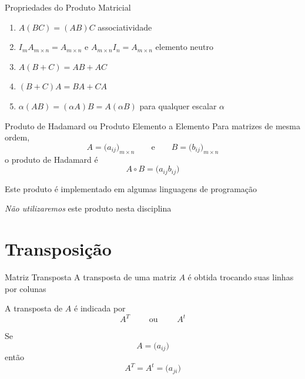\documentclass[fleqn,aspectratio=169,12pt]{beamer}
\begin{document}
\begin{frame}{Propriedades do Produto Matricial}

\begin{enumerate}[<+->][(i)\;]
\itemsep=1em
\item $A(BC) = (AB)C$
      \tabto{85mm} associatividade
\item \(I_m A_{m \times n} = A_{m \times n}\)
      \quad e \quad
      \(A_{m \times n} I_n = A_{m \times n}\)
      \tabto{85mm} elemento neutro
\item $A(B + C) = AB + AC$
\item $(B + C)A = BA + CA$
\item $\alpha(AB) = (\alpha A)B = A(\alpha B)$
      \tabto{85mm} para qualquer escalar $\alpha$
\end{enumerate}

\bigskip
{}
\end{frame}

\begin{frame}{Produto de Hadamard ou Produto Elemento a Elemento}
Para matrizes de mesma ordem,
\[
  A = \big( a_{ij} \big)_{m\times n}
  \qquad\text{e}\qquad
  B = \big( b_{ij} \big)_{m\times n}
\]
\pause
o produto de Hadamard é
\[
  A\circ B = \big( a_{ij} b_{ij} \big)
\]

\pause
Este produto é implementado em algumas linguagens de programação

\pause
\emph{Não utilizaremos} este produto nesta disciplina
\end{frame}

\section{Transposição}

\begin{frame}{Matriz Transposta}
  A transposta de uma matriz $A$ é obtida trocando suas
  linhas por colunas

  \pause
  A transposta de $A$ é indicada por
  \[
    A^T
    \qquad\text{ ou }\qquad
    A^t
  \]

  \pause
  Se
  \[
    A = \big( a_{ij} \big)
  \]
  \pause
  então
  \[
    A^T = A^t = \big( a_{ji} \big)
  \]
\end{frame}
\end{document}
